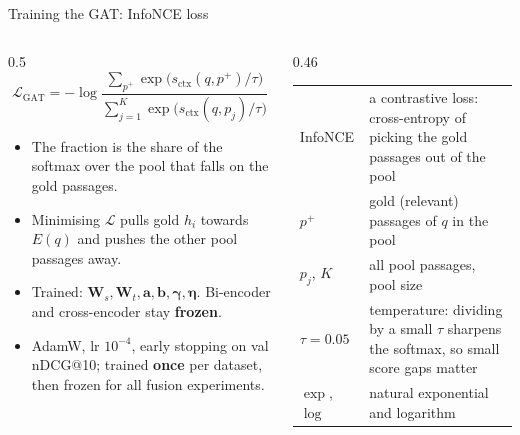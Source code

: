 \documentclass[aspectratio=169,11pt]{beamer}
\makeatletter
\newcommand{\gloss}[1]{\begingroup\footnotesize\renewcommand{\arraystretch}{1.18}\begin{tabular}{@{}>{\color{ctx}}l@{\hspace{0.6em}}>{\raggedright\arraybackslash}p{#1}@{}}}
\newcommand{\glossend}{\end{tabular}\endgroup}
\newcommand{\sctx}{s_{\mathrm{ctx}}}
\makeatother
\begin{document}
\begin{frame}{Training the GAT: InfoNCE loss}
\begin{columns}[T]
\begin{column}{0.5\textwidth}
\[\mathcal L_{\mathrm{GAT}}=-\log\frac{\sum_{p^+}\exp\big(\sctx(q,p^+)/\tau\big)}{\sum_{j=1}^{K}\exp\big(\sctx(q,p_j)/\tau\big)}\]
\begin{itemize}\setlength{\itemsep}{5pt}\small
  \item The fraction is the share of the softmax over the pool that falls on the gold passages.
  \item Minimising $\mathcal L$ pulls gold $h_i$ towards $E(q)$ and pushes the other pool passages away.
  \item Trained: $\mathbf W_s,\mathbf W_t,\mathbf a,\mathbf b,\boldsymbol\gamma,\boldsymbol\eta$. Bi-encoder and cross-encoder stay \textbf{frozen}.
  \item AdamW, lr $10^{-4}$, early stopping on val nDCG@10; trained \textbf{once} per dataset, then frozen for all fusion experiments.
\end{itemize}
\end{column}
\begin{column}{0.46\textwidth}
\gloss{4.6cm}
InfoNCE & a contrastive loss: cross-entropy of picking the gold passages out of the pool\\
$p^+$ & gold (relevant) passages of $q$ in the pool\\
$p_j$, $K$ & all pool passages, pool size\\
$\tau=0.05$ & temperature: dividing by a small $\tau$ sharpens the softmax, so small score gaps matter\\
$\exp$, $\log$ & natural exponential and logarithm\\
\glossend
\end{column}
\end{columns}
\end{frame}
\end{document}
